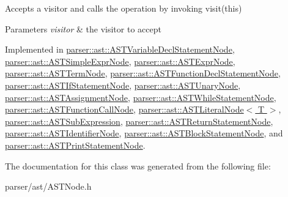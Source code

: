 Accepts a visitor and calls the operation by invoking {\ttfamily visit(this)} 
\begin{DoxyParams}{Parameters}
{\em visitor} & the visitor to accept \\
\hline
\end{DoxyParams}


Implemented in \hyperlink{classparser_1_1ast_1_1ASTVariableDeclStatementNode_a4448c73408ed86719c6f3993a4eb8869}{parser\+::ast\+::\+A\+S\+T\+Variable\+Decl\+Statement\+Node}, \hyperlink{classparser_1_1ast_1_1ASTSimpleExprNode_a493a0e358cc89eb16f7a7ae9982d6527}{parser\+::ast\+::\+A\+S\+T\+Simple\+Expr\+Node}, \hyperlink{classparser_1_1ast_1_1ASTExprNode_a3eea258af04a74930acc0c9fb6aade77}{parser\+::ast\+::\+A\+S\+T\+Expr\+Node}, \hyperlink{classparser_1_1ast_1_1ASTTermNode_a4937651cff0fac499c76f8f38fa4795d}{parser\+::ast\+::\+A\+S\+T\+Term\+Node}, \hyperlink{classparser_1_1ast_1_1ASTFunctionDeclStatementNode_ac7648205bc34d4cf7434274869d1b6a8}{parser\+::ast\+::\+A\+S\+T\+Function\+Decl\+Statement\+Node}, \hyperlink{classparser_1_1ast_1_1ASTIfStatementNode_a946a8196020e5d6c1a51a74d84d98e80}{parser\+::ast\+::\+A\+S\+T\+If\+Statement\+Node}, \hyperlink{classparser_1_1ast_1_1ASTUnaryNode_a4b3bd9c26548e1fb73a82fd5b20add0b}{parser\+::ast\+::\+A\+S\+T\+Unary\+Node}, \hyperlink{classparser_1_1ast_1_1ASTAssignmentNode_abfbf5dd90191738f1faea1334fe8480b}{parser\+::ast\+::\+A\+S\+T\+Assignment\+Node}, \hyperlink{classparser_1_1ast_1_1ASTWhileStatementNode_a448a46d9dbde688562ada266192735c8}{parser\+::ast\+::\+A\+S\+T\+While\+Statement\+Node}, \hyperlink{classparser_1_1ast_1_1ASTFunctionCallNode_ad7ff48d8398744b1211a6da0399a197b}{parser\+::ast\+::\+A\+S\+T\+Function\+Call\+Node}, \hyperlink{classparser_1_1ast_1_1ASTLiteralNode_a6d7a907614e19132b9c669f7aa32b735}{parser\+::ast\+::\+A\+S\+T\+Literal\+Node$<$ T $>$}, \hyperlink{classparser_1_1ast_1_1ASTSubExpression_a684e39e8385690e9bade65731ba5803b}{parser\+::ast\+::\+A\+S\+T\+Sub\+Expression}, \hyperlink{classparser_1_1ast_1_1ASTReturnStatementNode_ac66c375bc67277468711fdec08e93b15}{parser\+::ast\+::\+A\+S\+T\+Return\+Statement\+Node}, \hyperlink{classparser_1_1ast_1_1ASTIdentifierNode_a45633268cd67b109e9b9cc6d565e48f3}{parser\+::ast\+::\+A\+S\+T\+Identifier\+Node}, \hyperlink{classparser_1_1ast_1_1ASTBlockStatementNode_ae0e7e04747661471aade0c1509c37422}{parser\+::ast\+::\+A\+S\+T\+Block\+Statement\+Node}, and \hyperlink{classparser_1_1ast_1_1ASTPrintStatementNode_a15199624d689c55bd6d027132d2a9a64}{parser\+::ast\+::\+A\+S\+T\+Print\+Statement\+Node}.



The documentation for this class was generated from the following file\+:\begin{DoxyCompactItemize}
\item 
parser/ast/A\+S\+T\+Node.\+h\end{DoxyCompactItemize}
